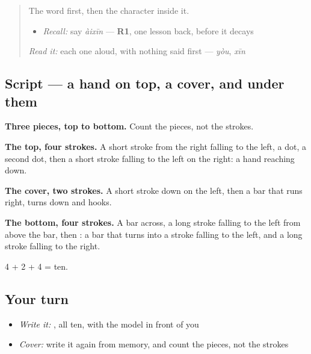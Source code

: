 \begin{quote}
The word first, then the character inside it.

\begin{itemize}
\raggedright
  \item \emph{Recall:} say \emph{àixīn} — \textbf{R1}, one lesson back, before it decays
\end{itemize}

\begin{quote}
 
\end{quote}

\emph{Read it:} each one aloud, with nothing said first — \emph{yòu}, \emph{xīn}
\end{quote}

\subsection*{Script — a hand on top, a cover, and  under them}

\begin{quote}
\end{quote}

\textbf{Three pieces, top to bottom.} Count the pieces, not the strokes.

\textbf{The top, four strokes.} A short stroke from the right falling to the left, a dot, a second dot, then a short stroke falling to the left on the right: a hand reaching down.

\textbf{The cover, two strokes.} A short stroke down on the left, then a bar that runs right, turns down and hooks.

\textbf{The bottom, four strokes.} A bar across, a long stroke falling to the left from above the bar, then : a bar that turns into a stroke falling to the left, and a long stroke falling to the right.

4 + 2 + 4 = ten.

\subsection*{Your turn}
\begin{itemize}
\raggedright
  \item \emph{Write it:} , all ten, with the model in front of you
  \item \emph{Cover:} write it again from memory, and count the pieces, not the strokes
\end{itemize}

